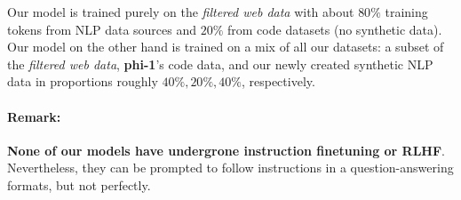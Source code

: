 Our \phionenlbase model is trained purely on the \textit{filtered web data} with about $80\%$ training tokens from NLP data sources and $20\%$ from code datasets (no synthetic data). Our \phionenl model on the other hand is trained on a mix of all our datasets: a subset of the \textit{filtered web data}, \textbf{phi-1}'s code data, and our newly created synthetic NLP data in proportions roughly $40\%, 20\%, 40\%$, respectively.

\paragraph{Remark:} \textbf{None of our models have undergrone instruction finetuning or RLHF}. Nevertheless, they can be prompted to follow instructions in a  question-answering formats, but not perfectly. %

